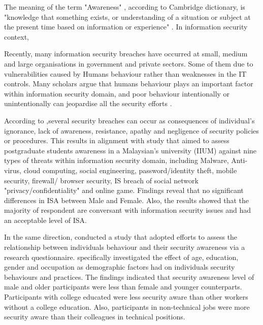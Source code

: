 The meaning of the term "Awareness" , according to Cambridge dictionary, is "knowledge that something exists, or understanding of a situation or subject at the present time based on information or experience" . In information security context, 





Recently, many information security breaches have occurred at small, medium and large organisations in government and private sectors. Some of them due to vulnerabilities caused by Humans behaviour rather than  weaknesses in the IT controls. Many scholars argue that humans behaviour plays an important factor within information security domain, and poor behaviour intentionally or unintentionally can jeopardise all the security efforts \cite{Kruger2006,Butavicius2017,Bawazir2016,Giraldo2014,Lebek2013,McCormac2016,safa2015information,Benbasat2010a}.  

According to \citet{safa2015information},several security breaches can occur as consequences of individual's ignorance, lack of awareness, resistance, apathy and negligence of security policies or procedures. 
This results in alignment with  \citet{Hamid2014} study that aimed to assess postgraduate students awareness in a Malaysian's university (IIUM) against nine types of threats within information security domain, including Malware, Anti-virus, cloud computing, social engineering, password/identity theft, mobile security, firewall/ browser security, IS breach of social network "privacy/confidentiality" and online game. Findings reveal that no significant differences in ISA between Male and Female. Also, the results showed that the majority of respondent are conversant with information security issues and had an acceptable level of ISA. 

In the same direction, \citet{Grant2010} conducted a study that adopted \citet{Katz2005} efforts to assess the relationship between individuals behaviour and their security awareness via a research questionnaire. \citet{Grant2010} specifically investigated the effect of age, education, gender and occupation as demographic factors had on individuals security behaviours and practices. The findings indicated that security awareness level of male and older participants were less than female and younger counterparts. Participants with college educated were less security aware than other workers without a college education. Also, participants in non-technical jobs were more security aware than their colleagues in technical positions.    
 

